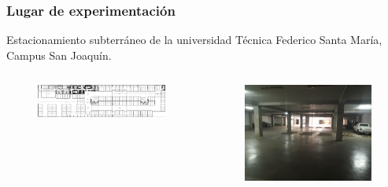 \documentclass[mathserif]{beamer}
\begin{document}
\begin{frame}
\frametitle{Lugar de experimentación}

Estacionamiento subterráneo de la universidad Técnica Federico Santa María, Campus San Joaquín.

\begin{columns}[t] %

\begin{figure}
\includegraphics[width=\textwidth]{../figures/estSubterraneo.png}
\end{figure}

\begin{figure}
\includegraphics[width=\textwidth]{../figures/estReal.jpg}
\end{figure}

\end{columns}

\end{frame}

\end{document}
